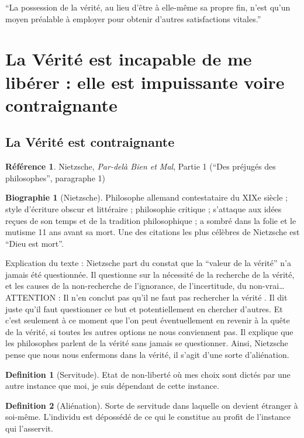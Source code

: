\documentclass[french]{book}
\theoremstyle{definition}
\newtheorem*{dfn}{Definition}
\newtheorem*{refe}{Référence}
\newtheorem*{bio}{Biographie}
\begin{document}
“La possession de la vérité, au lieu d’être à elle-même sa propre fin, n’est qu’un moyen préalable à employer pour obtenir d’autres satisfactions vitales.”

\section{La Vérité est incapable de me libérer : elle est impuissante voire contraignante}

\subsection{La Vérité est contraignante}

\begin{refe}
	Nietzsche, \textit{Par-delà Bien et Mal}, Partie 1 (“Des préjugés des philosophes”, paragraphe 1)
\end{refe}

\begin{bio}[Nietzsche]
	Philosophe allemand contestataire du XIXe siècle ; style d’écriture obscur et littéraire ; philosophie critique ; s’attaque aux idées reçues de son temps et de la tradition philosophique ; a sombré dans la folie et le mutisme 11 ans avant sa mort. Une des citations les plus célèbres de Nietzsche est “Dieu est mort”.
\end{bio}

Explication du texte :
Nietzsche part du constat que la “valeur de la vérité” n’a jamais été questionnée. Il questionne sur la nécessité de la recherche de la vérité, et les causes de la non-recherche de l’ignorance, de l’incertitude, du non-vrai…
ATTENTION : Il n’en conclut pas qu’il ne faut pas rechercher la vérité . Il dit juste qu’il faut questionner ce but et potentiellement en chercher d’autres. Et c’est seulement à ce moment que l’on peut éventuellement en revenir à la quête de la vérité, si toutes les autres options ne nous conviennent pas.
Il explique que les philosophes parlent de la vérité sans jamais se questionner. Ainsi, Nietzsche pense que nous nous enfermons dans la vérité, il s’agit d’une sorte d’aliénation.

\begin{dfn}[Servitude]
Etat de non-liberté où mes choix sont dictés par une autre instance que moi, je suis dépendant de cette instance.
\end{dfn}


\begin{dfn}[Aliénation]
Sorte de servitude dans laquelle on devient étranger à soi-même. L’individu est dépossédé de ce qui le constitue au profit de l’instance qui l’asservit.
\end{dfn}
\end{document}
